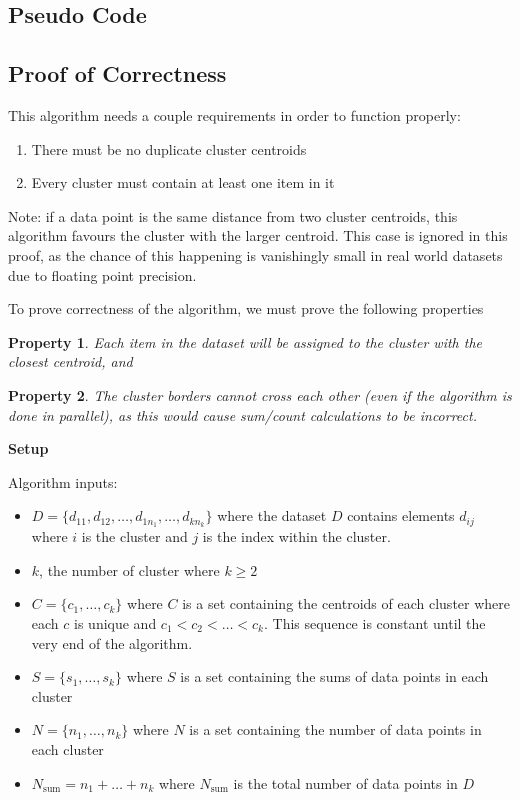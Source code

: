 \documentclass[conference]{IEEEtran}
\newtheorem{prp}{Property}
\begin{document}
\subsection{Pseudo Code}

\subsection{Proof of Correctness}

This algorithm needs a couple requirements in order to function properly:
\begin{enumerate}
    \item There must be no duplicate cluster centroids
    \item Every cluster must contain at least one item in it
\end{enumerate}

Note: if a data point is the same distance from two cluster centroids, this algorithm favours the cluster with the larger centroid.
This case is ignored in this proof, as the chance of this happening is vanishingly small in real world datasets due to floating point precision.

To prove correctness of the algorithm, we must prove the following properties
\begin{prp}\label{closest-centroid}Each item in the dataset will be assigned to the cluster with the closest centroid, and\end{prp}
\begin{prp}\label{border-cross}The cluster borders cannot cross each other (even if the algorithm is done in parallel), as this would cause sum/count calculations to be incorrect.\end{prp}

\textbf{Setup}

Algorithm inputs:
\begin{itemize}
\item $D = \{d_{11}, d_{12}, \dots , d_{1n_1}, \dots, d_{kn_k}\}$ where the dataset $D$ contains elements $d_{ij}$ where $i$ is the cluster and $j$ is the index within the cluster. 
\item $k$, the number of cluster where $k \geq 2$
\item $C = \{c_1, \dots, c_k\}$ where $C$ is a set containing the centroids of each cluster where each $c$ is unique and $c_1 < c_2 < \dots < c_k$. This sequence is constant until the very end of the algorithm.
\item $S = \{s_1, \dots, s_k\}$ where $S$ is a set containing the sums of data points in each cluster
\item $N = \{n_1, \dots, n_k\}$ where $N$ is a set containing the number of data points in each cluster
\item $N_{\text{sum}} = {n_1 + \dots + n_k}$ where $N_{\text{sum}}$ is the total number of data points in $D$
\end{itemize}
\end{document}
